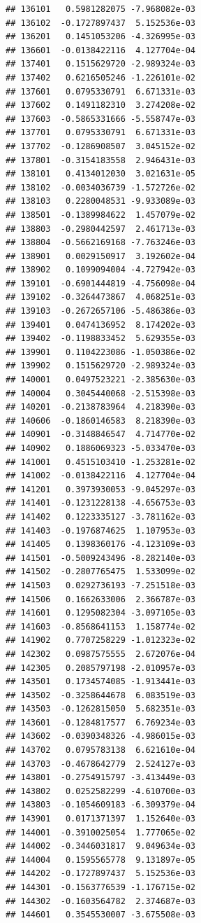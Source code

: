 \begin{frame}[fragile]
\begin{verbatim}
## 136101   0.5981282075 -7.968082e-03
## 136102  -0.1727897437  5.152536e-03
## 136201   0.1451053206 -4.326995e-03
## 136601  -0.0138422116  4.127704e-04
## 137401   0.1515629720 -2.989324e-03
## 137402   0.6216505246 -1.226101e-02
## 137601   0.0795330791  6.671331e-03
## 137602   0.1491182310  3.274208e-02
## 137603  -0.5865331666 -5.558747e-03
## 137701   0.0795330791  6.671331e-03
## 137702  -0.1286908507  3.045152e-02
## 137801  -0.3154183558  2.946431e-03
## 138101   0.4134012030  3.021631e-05
## 138102  -0.0034036739 -1.572726e-02
## 138103   0.2280048531 -9.933089e-03
## 138501  -0.1389984622  1.457079e-02
## 138803  -0.2980442597  2.461713e-03
## 138804  -0.5662169168 -7.763246e-03
## 138901   0.0029150917  3.192602e-04
## 138902   0.1099094004 -4.727942e-03
## 139101  -0.6901444819 -4.756098e-04
## 139102  -0.3264473867  4.068251e-03
## 139103  -0.2672657106 -5.486386e-03
## 139401   0.0474136952  8.174202e-03
## 139402  -0.1198833452  5.629355e-03
## 139901   0.1104223086 -1.050386e-02
## 139902   0.1515629720 -2.989324e-03
## 140001   0.0497523221 -2.385630e-03
## 140004   0.3045440068 -2.515398e-03
## 140201  -0.2138783964  4.218390e-03
## 140606  -0.1860146583  8.218390e-03
## 140901  -0.3148846547  4.714770e-02
## 140902   0.1886069323 -5.033470e-03
## 141001   0.4515103410 -1.253281e-02
## 141002  -0.0138422116  4.127704e-04
## 141201   0.3973930053 -9.045297e-03
## 141401  -0.1231228138 -4.656753e-03
## 141402   0.1223335127 -3.781162e-03
## 141403  -0.1976874625  1.107953e-03
## 141405   0.1398360176 -4.123109e-03
## 141501  -0.5009243496 -8.282140e-03
## 141502  -0.2807765475  1.533099e-02
## 141503   0.0292736193 -7.251518e-03
## 141506   0.1662633006  2.366787e-03
## 141601   0.1295082304 -3.097105e-03
## 141603  -0.8568641153  1.158774e-02
## 141902   0.7707258229 -1.012323e-02
## 142302   0.0987575555  2.672076e-04
## 142305   0.2085797198 -2.010957e-03
## 143501   0.1734574085 -1.913441e-03
## 143502  -0.3258644678  6.083519e-03
## 143503  -0.1262815050  5.682351e-03
## 143601  -0.1284817577  6.769234e-03
## 143602  -0.0390348326 -4.986015e-03
## 143702   0.0795783138  6.621610e-04
## 143703  -0.4678642779  2.524127e-03
## 143801  -0.2754915797 -3.413449e-03
## 143802   0.0252582299 -4.610700e-03
## 143803  -0.1054609183 -6.309379e-04
## 143901   0.0171371397  1.152640e-03
## 144001  -0.3910025054  1.777065e-02
## 144002  -0.3446031817  9.049634e-03
## 144004   0.1595565778  9.131897e-05
## 144202  -0.1727897437  5.152536e-03
## 144301  -0.1563776539 -1.176715e-02
## 144302  -0.1603564782  2.374687e-03
## 144601   0.3545530007 -3.675508e-03

\end{verbatim}
\end{frame}
